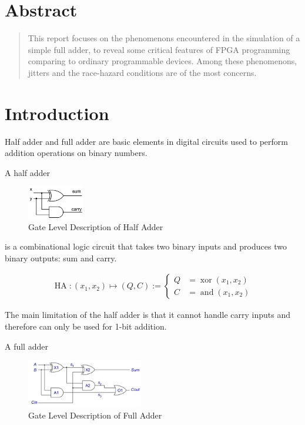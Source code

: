 
\section{Abstract}
\begin{abstract}
	This report focuses on the phenomenons encountered in the simulation of a simple full adder, to reveal some critical features of FPGA programming comparing to ordinary programmable devices. Among these phenomenons, jitters and the race-hazard conditions are of the most concerns.
\end{abstract}

\section{Introduction}

Half adder and full adder are basic elements in digital circuits used to perform addition operations on binary numbers.

A half adder

\begin{figure}[htpb]
	\begin{center}
		\includegraphics[width=0.22\textwidth]{index.assets/20240303235723.png}
		\caption{Gate Level Description of Half Adder}
	\end{center}
\end{figure}

is a combinational logic circuit that takes two binary inputs and produces two binary outputs: sum and carry.

\begin{eqnarray}
	\mathop{\mathrm{HA}}:(x_1,x_2)\mapsto(Q,C) :=
	\begin{cases}
			Q&=\mathop{\mathrm{xor}}(x_1,x_2) \\
			C&=\mathop{\mathrm{and}}(x_1,x_2)
	\end{cases}
\end{eqnarray}

The main limitation of the half adder is that it cannot handle carry inputs and therefore can only be used for 1-bit addition.

A full adder

\begin{figure}[htpb]
	\begin{center}
		\includegraphics[width=0.45\textwidth]{index.assets/20240303235337.png}
		\caption{Gate Level Description of Full Adder}
	\end{center}
\end{figure}\label{FA_GateLevel}


